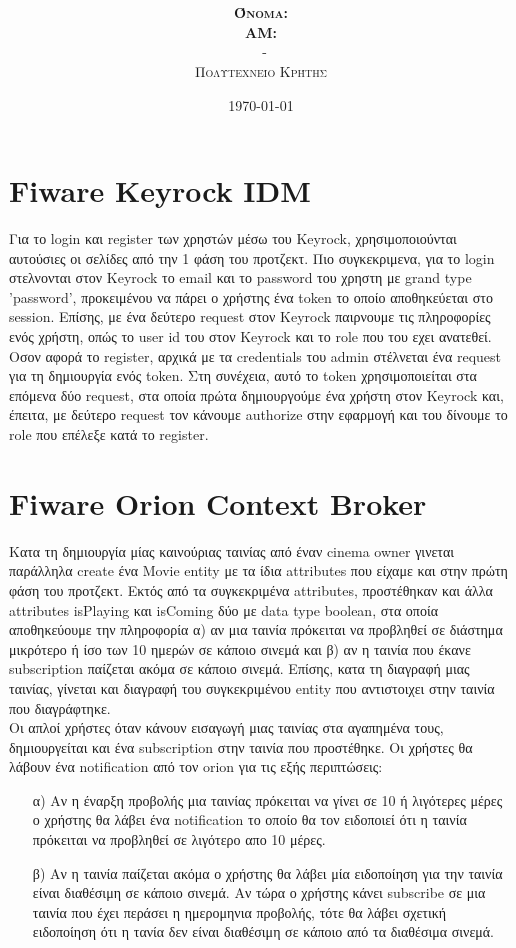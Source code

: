 \documentclass{article}
\title{\underline{\textbf{\assignmentNumber}}}
\author{\textsc{\textbf{Όνομα:}}  \studentName\\
		\textsc{\textbf{ΑΜ:}}  \studentNumber\\
		\course \ - \courseName\\ 
		\textsc{Πολυτεχνείο Κρήτης}
		}
\date{\today}
\begin{document}
	\maketitle
	
\section*{Fiware Keyrock IDM}
    Για το login και register των χρηστών μέσω του Keyrock, χρησιμοποιούνται αυτούσιες οι σελίδες από την 1 φάση του προτζεκτ. Πιο συγκεκριμενα, για το login στελνονται στον Keyrock το email και το password του χρηστη με grand type 'password', προκειμένου να πάρει ο χρήστης ένα token το οποίο αποθηκεύεται στο session. Επίσης, με ένα δεύτερο request στον Κeyrock παιρνουμε τις πληροφορίες ενός χρήστη, οπώς το user id του στον Κeyrock και το role που του εχει ανατεθεί. Οσον αφορά το register, αρχικά με τα credentials του admin στέλνεται ένα request για τη δημιουργία ενός token. Στη συνέχεια, αυτό το token χρησιμοποιείται στα επόμενα δύο request, στα οποία πρώτα δημιουργούμε ένα χρήστη στον Keyrock και, έπειτα, με δεύτερο request τον κάνουμε authorize στην εφαρμογή και του δίνουμε το role που επέλεξε κατά το register. 
    
\section*{Fiware Orion Context Broker}
    Κατα τη δημιουργία μίας καινούριας ταινίας από έναν cinema owner γινεται παράλληλα create ένα Movie entity με τα ίδια attributes που είχαμε και στην πρώτη φάση του προτζεκτ. Εκτός από τα συγκεκριμένα attributes, προστέθηκαν και άλλα attributes isPlaying και isComing δύο με data type boolean, στα οποία αποθηκεύουμε την πληροφορία α) αν μια ταινία πρόκειται να προβληθεί σε διάστημα μικρότερο ή ίσο των 10 ημερών σε κάποιο σινεμά και β) αν η ταινία που έκανε subscription παίζεται ακόμα σε κάποιο σινεμά. Επίσης, κατα τη διαγραφή μιας ταινίας, γίνεται και διαγραφή του συγκεκριμένου entity που αντιστοιχει στην ταινία που διαγράφτηκε. \\
    
    \noindent
    Οι απλοί χρήστες όταν κάνουν εισαγωγή μιας ταινίας στα αγαπημένα τους, δημιουργείται και ένα subscription στην ταινία που προστέθηκε. Οι χρήστες θα λάβουν ένα notification από τον orion για τις εξής περιπτώσεις: 
    
    \begin{itemize}
        \item[α)] Αν η έναρξη προβολής μια ταινίας πρόκειται να γίνει σε 10 ή λιγότερες μέρες ο χρήστης θα λάβει ένα notification το οποίο θα τον ειδοποιεί ότι η ταινία πρόκειται να προβληθεί σε λιγότερο απο 10 μέρες.
        \item[β)] Αν η ταινία παίζεται ακόμα ο χρήστης θα λάβει μία ειδοποίηση για την ταινία είναι διαθέσιμη σε κάποιο σινεμά. Αν τώρα ο χρήστης κάνει subscribe σε μια ταινία που έχει περάσει η ημερομηνια προβολής, τότε θα λάβει σχετική ειδοποίηση ότι η τανία δεν είναι διαθέσιμη σε κάποιο από τα διαθέσιμα σινεμά.
    \end{itemize}
    
\end{document}
